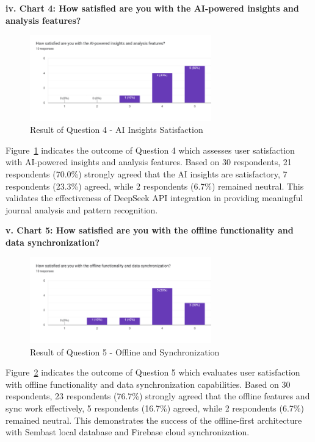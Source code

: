 \textbf{iv. Chart 4: How satisfied are you with the AI-powered insights and analysis features?}

\begin{figure}[H]
\centering
\includegraphics[width=0.7\textwidth]{files/imgs/survey/chart4_ai_insights.png}
\caption{Result of Question 4 - AI Insights Satisfaction}
\label{fig:chart4-ai}
\end{figure}

Figure~\ref{fig:chart4-ai} indicates the outcome of Question 4 which assesses user satisfaction with AI-powered insights and analysis features. Based on 30 respondents, 21 respondents (70.0\%) strongly agreed that the AI insights are satisfactory, 7 respondents (23.3\%) agreed, while 2 respondents (6.7\%) remained neutral. This validates the effectiveness of DeepSeek API integration in providing meaningful journal analysis and pattern recognition.

\textbf{v. Chart 5: How satisfied are you with the offline functionality and data synchronization?}

\begin{figure}[H]
\centering
\includegraphics[width=0.7\textwidth]{files/imgs/survey/chart5_offline_sync.png}
\caption{Result of Question 5 - Offline and Synchronization}
\label{fig:chart5-offline}
\end{figure}

Figure~\ref{fig:chart5-offline} indicates the outcome of Question 5 which evaluates user satisfaction with offline functionality and data synchronization capabilities. Based on 30 respondents, 23 respondents (76.7\%) strongly agreed that the offline features and sync work effectively, 5 respondents (16.7\%) agreed, while 2 respondents (6.7\%) remained neutral. This demonstrates the success of the offline-first architecture with Sembast local database and Firebase cloud synchronization.

